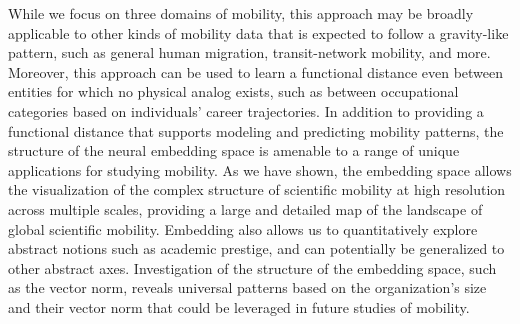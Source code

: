 \documentclass[12pt]{article} %
\begin{document}
While we focus on three domains of mobility, this approach may be broadly applicable to other kinds of mobility data that is expected to follow a gravity-like pattern, such as general human migration, transit-network mobility, and more.
Moreover, this approach can be used to learn a functional distance even between entities for which no physical analog exists, such as between occupational categories based on individuals' career trajectories.
In addition to providing a functional distance that supports modeling and predicting mobility patterns, the structure of the neural embedding space is amenable to a range of unique applications for studying mobility.
As we have shown, the embedding space allows the visualization of the complex structure of scientific mobility at high resolution across multiple scales, providing a large and detailed map of the landscape of global scientific mobility.
Embedding also allows us to quantitatively explore abstract notions such as academic prestige, and can potentially be generalized to other abstract axes.
Investigation of the structure of the embedding space, such as the vector norm, reveals universal patterns based on the organization's size and their vector norm that could be leveraged in future studies of mobility.
\end{document}
